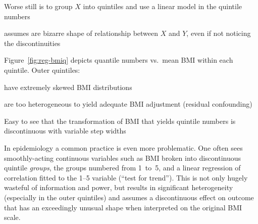 \bi
\item Worse still is to group $X$ into quintiles and use a linear
  model in the quintile numbers
  \bi
  \item assumes are bizarre shape of relationship between $X$ and $Y$,
    even if not noticing the discontinuities
  \ei
\item Figure~\ref{fig:reg-bmiq} depicts quantile numbers vs.\ mean BMI
  within each quintile.  Outer quintiles:
  \bi
  \item have extremely skewed BMI distributions
  \item are too heterogeneous to yield adequate BMI adjustment
    (residual confounding)
  \ei
\item Easy to see that the transformation of BMI that yields quintile
  numbers is discontinuous with variable step widths
\ei

In epidemiology a common practice is even more problematic.  One often
\ipacue
sees smoothly-acting continuous variables such as BMI broken into
discontinuous quintile \emph{groups}, the groups numbered from 1~to~5,
and a linear regression of correlation fitted to the 1--5 variable
(``test for trend'').
This is not only hugely wasteful of information and power, but results
in significant heterogeneity (especially in the outer quintiles) and
assumes a discontinuous effect on outcome that has an exceedingly
unusual shape when interpreted on the original BMI scale.


